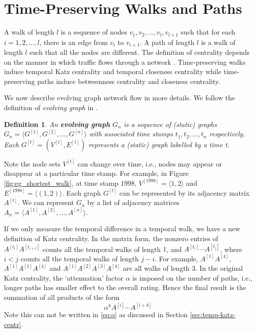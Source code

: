 \documentclass[12pt]{article}
\newtheorem{definition}{Definition}
\theoremstyle{definition}
\begin{document}
\section{Time-Preserving Walks and Paths}
\label{sec:time-pres-paths}

A walk of length $l$ is a sequence of nodes $v_1, v_2, \ldots, v_l, v_{l+1}$ such that for
each $i = 1, 2, \ldots, l$, there is an edge from $v_i$ to $v_{i+1}$. A path of length $l$ is a walk of length $l$
such that all the nodes are different.
The definition of centrality depends on the manner in which traffic flows through a network \cite{borgatti05}.
Time-preserving walks induce temporal Katz centrality and temporal closeness centrality while time-preserving paths induce betweenness centrality and closeness centrality.


We now describe evolving graph network flow in more details. We follow the definition of
\emph{evolving graph} in \cite{chen16}.

\begin{definition}
  An \textbf{evolving graph} $G_n$ is a sequence of (static) graphs
$G_n = \langle G^{[1]}, G^{[2]},  \ldots ,G^{[n]} \rangle$ with associated time stamps
$t_1, t_2, \ldots, t_n$ respectively. Each $G^{[t]} = (V^{[t]}, E^{[t]})$ represents a (static) graph labelled by a time t.
\end{definition}

Note the node sets $V^{[t]}$ can change over time, i.e., nodes may appear or disappear at a particular time stamp.
For example, in Figure \ref{fig:eg_shortest_walk}, at time stamp $1998$, $V^{[1998]} = \langle 1, 2 \rangle$ and $E^{[1998]} = \langle (1,2) \rangle$. Each graph $G^{[t]}$ can be represented by its adjacency matrix $A^{[t]}$.
We can represent $G_n$ by a list of adjacency matrices $A_n = \langle A^{[1]}, A^{[2]}, \ldots, A^{[n]} \rangle$.

If we only measure the temporal difference in a temporal walk, we have a new definition of Katz centrality.
In the matrix form, the nonzero entries of $A^{[t_i]} A^{[t_{i+1}]}$ counts all the temporal walks of length $1$, and
$A^{[t_i]}\cdots A^{[t_j]}$, where $i < j$ counts all the temporal walks of length $j -i$.
For example, $A^{[1]}A^{[4]}$, $A^{[1]}A^{[1]}A^{[4]}$ and $A^{[1]}A^{[2]}A^{[3]}A^{[4]}$ are all walks of length 3.
In the original Katz centrality, the `attenuation' factor $\alpha$ is imposed on the
number of paths, i.e., longer paths has smaller effect to the overall rating.
Hence the final result is the summation of all products of the form
\[
\alpha^k A^{[i]} \cdots A^{[i+k]}
\]
Note this can not be written in \eqref{eq:q} as discussed in Section \ref{sec:temp-katz-centr}.
\end{document}
